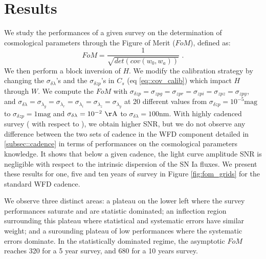 \documentclass[\docopts]{\docclass}
\begin{document}
\section{Results}
\label{sec::results}
We study the performances of a given survey on the determination of cosmological parameters through the Figure of Merit ($FoM$), defined as:
\begin{equation}
FoM = \frac{1}{\sqrt{det(cov(w_0, w_a))}} \text{ .}
\end{equation}
We then perform a block inversion of $H$.
We modify the calibration strategy by changing the $\sigma_{\delta \lambda}$'s and the $\sigma_{\delta zp}$'s in $C_s$ (eq \ref{eq::cov_calib}) which impact $H$ through $W$.
We compute the $FoM$ with $\sigma_{\delta zp} = \sigma_{zpg} = \sigma_{zpr} = \sigma_{zpi} = \sigma_{zpz} = \sigma_{zpy}$, and $\sigma_{\delta\lambda} = \sigma_{\lambda_g} = \sigma_{\lambda_r} = \sigma_{\lambda_i} = \sigma_{\lambda_z} = \sigma_{\lambda_y}$ at 20 different values from $\sigma_{\delta zp} = 10^{-5}\mathrm{mag}$ to $\sigma_{\delta zp} = 1\mathrm{mag}$ and $\sigma_{\delta \lambda} = 10^{-2}\ \mathrm{\AA}$ to $\sigma_{\delta \lambda} = 100\mathrm{nm}$.
With highly cadenced survey ( with respect to ), we obtain higher SNR, but we do not observe any difference between the two sets of cadence in the WFD component detailed in \ref{subsec::cadence} in terms of performances on the cosmological parameters knowledge.
It shows that below a given cadence, the light curve amplitude SNR is negligible with respect to the intrinsic dispersion of the SN Ia fluxes.
We present these results for one, five and ten years of survey in Figure \ref{fig:fom_grids} for the standard WFD cadence.

We observe three distinct areas: a plateau on the lower left where the
survey performances saturate and are statistic dominated; an inflection
region surrounding this plateau where statistical and systematic errors
have similar weight; and a surounding plateau of low performances where
the systematic errors dominate.
In the statistically dominated regime, the asymptotic $FoM$ reaches 320 for a 5 year survey, and 680 for a 10 years survey.
\end{document}

